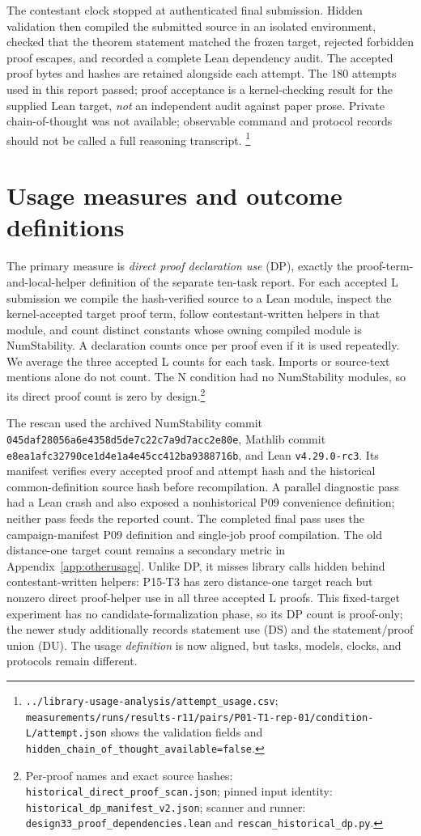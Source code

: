 \documentclass[10pt]{article}
\newcommand{\pathref}[1]{\nolinkurl{#1}}
\begin{document}
The contestant clock stopped at authenticated final submission. Hidden
validation then compiled the submitted source in an isolated environment,
checked that the theorem statement matched the frozen target, rejected
forbidden proof escapes, and recorded a complete Lean dependency audit.
The accepted proof bytes and hashes are retained alongside each attempt.
The 180 attempts used in this report passed; proof acceptance is a
kernel-checking result for the supplied Lean target, \emph{not} an
independent audit against paper prose. Private chain-of-thought was not
available; observable command and protocol records should not be called
a full reasoning transcript.
\footnote{\pathref{../library-usage-analysis/attempt_usage.csv};
\pathref{measurements/runs/results-r11/pairs/P01-T1-rep-01/condition-L/attempt.json}
shows the validation fields and
\pathref{hidden_chain_of_thought_available=false}.}

\clearpage
\section{Usage measures and outcome definitions}
The primary measure is \emph{direct proof declaration use} (DP), exactly
the proof-term-and-local-helper definition of the separate ten-task report.
For each accepted L submission we compile the hash-verified source to a
Lean module, inspect the kernel-accepted target proof term, follow
contestant-written helpers in that module, and count distinct constants
whose owning compiled module is NumStability. A declaration counts once
per proof even if it is used repeatedly. We average the three accepted
L counts for each task. Imports or source-text mentions alone do not
count. The N condition had no NumStability modules, so its direct proof
count is zero by design.\footnote{Per-proof names and exact source hashes:
\pathref{historical_direct_proof_scan.json}; pinned input identity:
\pathref{historical_dp_manifest_v2.json}; scanner and runner:
\pathref{design33_proof_dependencies.lean} and
\pathref{rescan_historical_dp.py}.}

The rescan used the archived NumStability commit
\texttt{045daf28056a6e4358d5de7c22c7a9d7acc2e80e}, Mathlib commit
\texttt{e8ea1afc32790ce1d4e1a4e45cc412ba9388716b}, and Lean
\texttt{v4.29.0-rc3}. Its manifest verifies every accepted proof and
attempt hash and the historical common-definition source hash before
recompilation. A parallel diagnostic pass had a Lean crash and also
exposed a nonhistorical P09 convenience definition; neither pass feeds
the reported count. The completed final pass uses the campaign-manifest
P09 definition and single-job proof compilation. The old distance-one
target count remains a secondary metric in Appendix~\ref{app:otherusage}.
Unlike DP, it misses library calls hidden behind contestant-written
helpers: P15-T3 has zero distance-one target reach but nonzero direct
proof-helper use in all three accepted L proofs. This fixed-target
experiment has no candidate-formalization phase, so its DP count is
proof-only; the newer study additionally records statement use (DS) and
the statement/proof union (DU). The usage \emph{definition} is now
aligned, but tasks, models, clocks, and protocols remain different.
\end{document}
